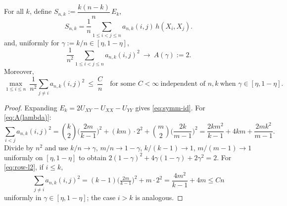 \documentclass[10pt,a4paper]{amsart}
\begin{document}
\begin{Lemma}\label{lem:weights}
For all $k$, define $S_{n,k}:=\dfrac{k(n-k)}{n}\,E_k$,
\begin{equation}\label{eq:symm-id}
S_{n,k}=\frac{1}{n}\sum_{1\le i<j\le n} a_{n,k}(i,j)\,h(X_i,X_j).
\end{equation}
and, uniformly for $\gamma:=k/n\in[\eta,1-\eta]$,
\begin{equation}\label{eq:A(lambda)}
\frac{1}{n^2}\sum_{1\le i<j\le n} a_{n,k}(i,j)^2 \ \longrightarrow\ A(\gamma):=2.
\end{equation}
Moreover,
\begin{equation}\label{eq:row-l2}
\max_{1\le i\le n}\ \frac{1}{n^2}\sum_{j\ne i} a_{n,k}(i,j)^2 \ \le\ \frac{C}{n}
\quad\text{for some }C<\infty\ \text{independent of }n,k\ \text{when }\gamma\in[\eta,1-\eta].
\end{equation}
\end{Lemma}

\begin{proof}
Expanding $E_k=2U_{XY}-U_{XX}-U_{YY}$ gives \eqref{eq:symm-id}.
For \eqref{eq:A(lambda)}:
\[
\sum_{i<j} a_{n,k}(i,j)^2
=\binom{k}{2}\Big(\frac{2m}{k-1}\Big)^2 + (km)\cdot 2^2 + \binom{m}{2}\Big(\frac{2k}{m-1}\Big)^2
=\frac{2km^2}{k-1}+4km+\frac{2mk^2}{m-1}.
\]
Divide by $n^2$ and use $k/n\to\gamma$, $m/n\to 1-\gamma$, $k/(k-1)\to1$, $m/(m-1)\to1$ uniformly on $[\eta,1-\eta]$ to obtain $2(1-\gamma)^2+4\gamma(1-\gamma)+2\gamma^2=2$. For \eqref{eq:row-l2}, if $i\le k$,
\[
\sum_{j\ne i} a_{n,k}(i,j)^2
=(k-1)\Big(\tfrac{2m}{k-1}\Big)^2 + m\cdot 2^2
=\frac{4m^2}{k-1}+4m
\le C n
\]
uniformly in $\gamma\in[\eta,1-\eta]$; the case $i>k$ is analogous.
\end{proof}
\end{document}
